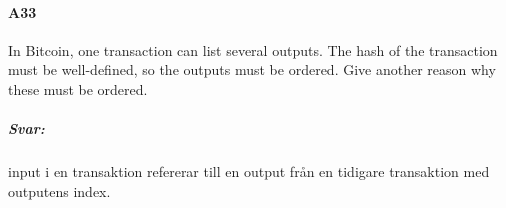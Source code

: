 \documentclass[a4paper]{article}
\begin{document}
\paragraph{A33} 
In Bitcoin, one transaction can list several outputs. The hash of the transaction must be well-defined,
so the outputs must be ordered. Give another reason why these must be ordered.
\subparagraph{Svar:}  input i en transaktion refererar till en output från en tidigare transaktion med outputens index.
\end{document}
